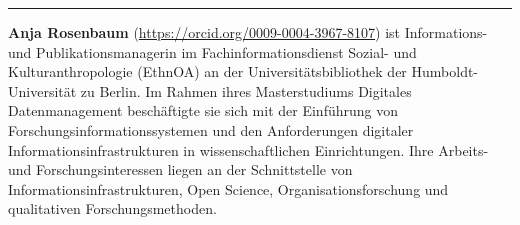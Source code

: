 \begin{center}\rule{0.5\linewidth}{0.5pt}\end{center}

\textbf{Anja Rosenbaum} (\url{https://orcid.org/0009-0004-3967-8107}) ist
Informations- und Publikationsmanagerin im Fachinformationsdienst
Sozial- und Kulturanthropologie (EthnOA) an der Universitätsbibliothek
der Humboldt-Universität zu Berlin. Im Rahmen ihres Masterstudiums
Digitales Datenmanagement beschäftigte sie sich mit der Einführung von
Forschungsinformationssystemen und den Anforderungen digitaler
Informationsinfrastrukturen in wissenschaftlichen Einrichtungen. Ihre
Arbeits- und Forschungsinteressen liegen an der Schnittstelle von
Informationsinfrastrukturen, Open Science, Organisationsforschung und
qualitativen Forschungsmethoden.
